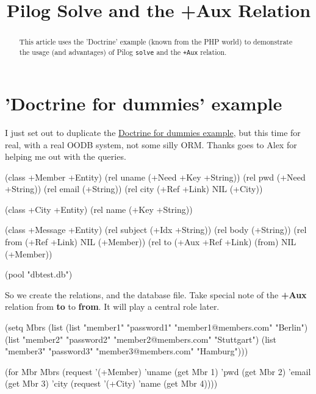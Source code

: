 \title{Pilog Solve and the +Aux Relation}

\maketitle


\begin{abstract}
  This article uses the 'Doctrine' example (known from the PHP world)
  to demonstrate the usage (and advantages) of Pilog \texttt{solve} and
  the \texttt{+Aux} relation. 
\end{abstract}

\section{'Doctrine for dummies' example}
\label{sec:pilog-solve-'doctrine-for-dummies'-example}


I just set out to duplicate the
\href{http://www.prodevtips.com/2008/08/05/doctrine-for-dummies/}{Doctrine
  for dummies example}, but this time for real, with a real OODB
system, not some silly ORM. Thanks goes to Alex for helping me out with
the queries.


\begin{wideverbatim}
(class +Member +Entity)
(rel uname  (+Need +Key +String))
(rel pwd    (+Need +String))
(rel email  (+String))
(rel city   (+Ref +Link) NIL (+City))

(class +City +Entity)
(rel name   (+Key +String))

(class +Message +Entity)
(rel subject (+Idx +String))
(rel body    (+String))
(rel from    (+Ref +Link) NIL (+Member))
(rel to      (+Aux +Ref +Link) (from) NIL (+Member))

(pool "dbtest.db")
\end{wideverbatim}

So we create the relations, and the database file. Take special note of
the \textbf{+Aux} relation from \textbf{to} to \textbf{from}. It will play a central role
later.


\begin{wideverbatim}
(setq Mbrs 
  (list
     (list "member1" "password1" "member1@members.com" "Berlin")
     (list "member2" "password2" "member2@members.com" "Stuttgart")
     (list "member3" "password3" "member3@members.com" "Hamburg")))
  
(for Mbr Mbrs
  (request '(+Member) 
     'uname (get Mbr 1) 
     'pwd   (get Mbr 2) 
     'email (get Mbr 3) 
     'city  (request '(+City) 'name (get Mbr 4))))
\end{wideverbatim}


